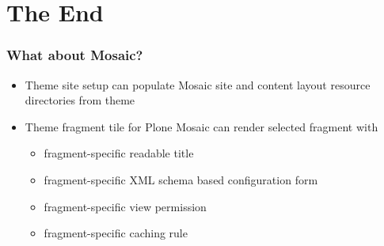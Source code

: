 \documentclass[aspectratio=43]{beamer}
\begin{document}

\section{The End}

{
%
\begin{frame}[plain,t]
  \vfill
  \centering
  \Huge
  \bfseries
  \lsstyle
  \par
  \large
  \contourlength{0.75pt}
\end{frame}
}

\begin{frame}[plain,t]
  \frametitle{What about Mosaic?}
  \begin{itemize}
  \setlength{\itemsep}{1em}
  \item Theme site setup can populate Mosaic site and content layout
  resource directories from theme
  \item Theme fragment tile for Plone Mosaic
  can render selected fragment with
  \vspace{1em}
  \begin{itemize}
  \setlength{\itemsep}{1em}
  \item fragment-specific readable title
  \item fragment-specific XML schema based configuration form
  \item fragment-specific view permission
  \item fragment-specific caching rule
  \end{itemize}
  \end{itemize}
\end{frame}
\end{document}
